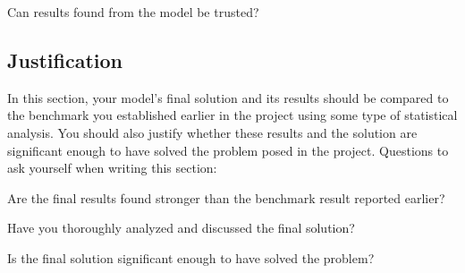 \documentclass[12pt,journal,compsoc]{IEEEtran}
\begin{document}
Can results found from the model be trusted?

\subsection{Justification}
In this section, your model’s final solution and its results should be compared to the benchmark you established earlier in the project using some type of statistical analysis. You should also justify whether these results and the solution are significant enough to have solved the problem posed in the project. Questions to ask yourself when writing this section:

Are the final results found stronger than the benchmark result reported earlier?

Have you thoroughly analyzed and discussed the final solution?

Is the final solution significant enough to have solved the problem?
\end{document}
